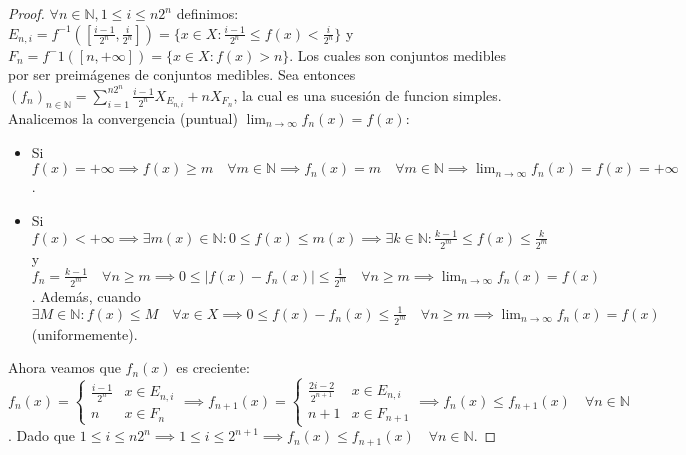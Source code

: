 \begin{proof}
    $\forall n \in \mathbb{N}, 1 \leq i \leq n2^n$ definimos:
    $E_{n, i} = f^{-1}([\frac{i-1}{2^n}, \frac{i}{2^n}]) = \{x \in X : \frac{i-1}{2^n} \leq f(x) < \frac{i}{2^n}\}$ y $F_n = f^-1([n, +\infty]) = \{x \in X : f(x) > n\}$.
    Los cuales son conjuntos medibles por ser preimágenes de conjuntos medibles. Sea entonces $(f_n)_{n\in\mathbb{N}} = \sum_{i = 1}^{n2^n}\frac{i-1}{2^n}X_{E_{n, i}} + nX_{F_n}$, la cual es una sucesión de funcion simples.
    Analicemos la convergencia (puntual) $\lim_{n \to \infty}f_n(x) = f(x)$:
    \begin{itemize}
        \item Si $f(x) = +\infty \implies f(x) \geq m \quad \forall m \in \mathbb{N} \implies
                  f_n(x) = m \quad \forall m \in \mathbb{N} \implies \lim_{n \to \infty}f_n(x) =
                  f(x) = +\infty$.
        \item Si $f(x) < +\infty \implies \exists m(x) \in \mathbb{N} : 0 \leq f(x) \leq m(x)
                  \implies \exists k \in \mathbb{N} : \frac{k-1}{2^m} \leq f(x) \leq
                  \frac{k}{2^m}$ y $f_n = \frac{k-1}{2^m} \quad \forall n \geq m \implies 0 \leq
                  |f(x) - f_n(x)| \leq \frac{1}{2^m} \quad \forall n \geq m \implies \lim_{n \to
                      \infty}f_n(x) = f(x)$. Además, cuando $\exists M \in \mathbb{N} : f(x) \leq M
                  \quad \forall x \in X \implies 0 \leq f(x) - f_n(x) \leq \frac{1}{2^m} \quad
                  \forall n \geq m \implies \lim_{n \to \infty}f_n(x) = f(x)$ (uniformemente).
    \end{itemize}
    Ahora veamos que $f_n(x)$ es creciente:
    $f_n(x) = \begin{cases}
            \frac{i-1}{2^n} & x \in E_{n, i} \\
            n               & x \in F_n
        \end{cases}
        \implies f_{n+1}(x) = \begin{cases}
            \frac{2i-2}{2^{n+1}} & x \in E_{n, i} \\
            n+1                  & x \in F_{n+1}
        \end{cases}
        \implies f_n(x) \leq f_{n+1}(x) \quad \forall n \in \mathbb{N}$. Dado que $1 \leq i \leq n2^n \implies 1 \leq i \leq 2^{n+1} \implies f_n(x) \leq f_{n+1}(x) \quad \forall n \in \mathbb{N}$.
\end{proof}

